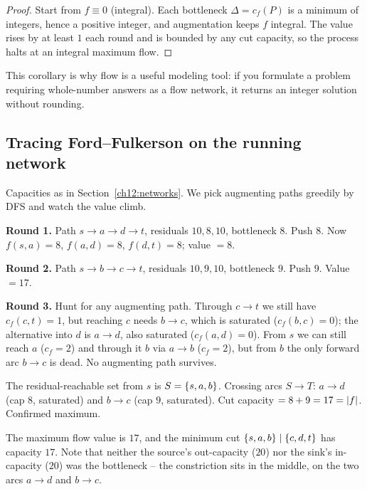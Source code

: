 \begin{proof}
Start from $f\equiv 0$ (integral). Each bottleneck $\Delta=c_f(P)$ is a minimum of
integers, hence a positive integer, and augmentation keeps $f$ integral. The value
rises by at least $1$ each round and is bounded by any cut capacity, so the
process halts at an integral maximum flow.
\end{proof}

This corollary is why flow is a useful modeling tool: if you formulate a problem requiring whole-number answers as a flow network, it returns an integer solution without rounding.

\subsection{Tracing Ford--Fulkerson on the running network}

\begin{labbox}
Capacities as in Section~\ref{ch12:networks}. We pick augmenting paths greedily by
DFS and watch the value climb.

\textbf{Round 1.} Path $s\to a\to d\to t$, residuals $10,8,10$, bottleneck $8$.
Push $8$. Now $f(s,a)=8$, $f(a,d)=8$, $f(d,t)=8$; value $=8$.

\textbf{Round 2.} Path $s\to b\to c\to t$, residuals $10,9,10$, bottleneck $9$.
Push $9$. Value $=17$.

\textbf{Round 3.} Hunt for any augmenting path. Through $c\to t$ we still have
$c_f(c,t)=1$, but reaching $c$ needs $b\to c$, which is saturated
($c_f(b,c)=0$); the alternative into $d$ is $a\to d$, also saturated
($c_f(a,d)=0$). From $s$ we can still reach $a$ ($c_f=2$) and through it $b$ via
$a\to b$ ($c_f=2$), but from $b$ the only forward arc $b\to c$ is dead. No
augmenting path survives.

The residual-reachable set from $s$ is $S=\{s,a,b\}$. Crossing arcs $S\to T$:
$a\to d$ (cap $8$, saturated) and $b\to c$ (cap $9$, saturated). Cut capacity
$=8+9=17=\lvert f\rvert$. Confirmed maximum.
\end{labbox}

The maximum flow value is $17$, and the minimum cut $\{s,a,b\}\mid\{c,d,t\}$
has capacity $17$. Note that neither the source's out-capacity ($20$) nor the
sink's in-capacity ($20$) was the bottleneck -- the constriction sits in the
middle, on the two arcs $a\to d$ and $b\to c$.

